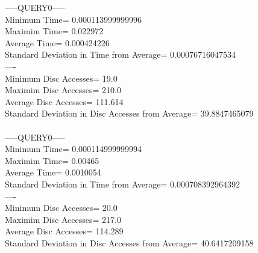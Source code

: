 \documentclass[12pt]{article}%
\begin{document}
		-----QUERY0-----		\\
Minimum Time= 0.000113999999996\\
Maximim Time= 0.022972\\
Average Time= 0.000424226\\
Standard Deviation in Time from Average= 0.00076716047534\\
----\\
Minimum Disc Accesses= 19.0\\
Maximim Disc Accesses= 210.0\\
Average Disc Accesses= 111.614\\
Standard Deviation in Disc Accesses from Average= 39.8847465079\\
\\
		-----QUERY0-----		\\
Minimum Time= 0.000114999999994\\
Maximim Time= 0.00465\\
Average Time= 0.0010054\\
Standard Deviation in Time from Average= 0.000708392964392\\
----\\
Minimum Disc Accesses= 20.0\\
Maximim Disc Accesses= 217.0\\
Average Disc Accesses= 114.289\\
Standard Deviation in Disc Accesses from Average= 40.6417209158\\
\\
 
\end{document}
